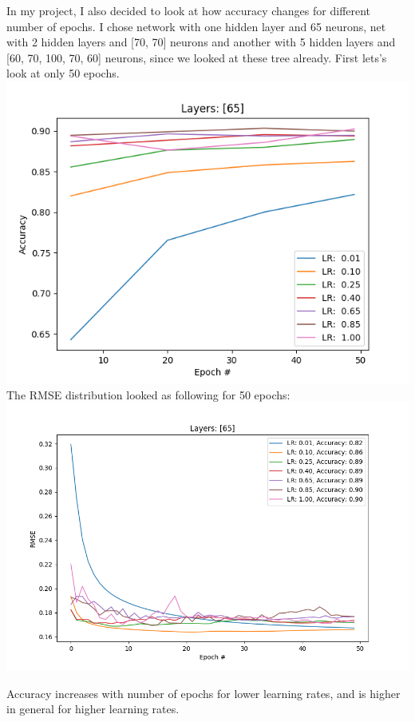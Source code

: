 \documentclass[12pt, letterpaper]{article}
\begin{document}
\begin{enumerate}[label=\Roman*.]
	   In my project, I also decided to look at how accuracy changes for different number of epochs. I chose network with one hidden layer and 65 neurons, net with 2 hidden layers and [70, 70] neurons and another with 5 hidden layers and  [60, 70, 100, 70, 60] neurons, since we looked at these tree already. First lets's look at only 50 epochs.
	   {\center \includegraphics[scale=0.7]{../images/accuracy_0.png} \\}
	   The RMSE distribution looked as following for 50 epochs: 
	   {\center \includegraphics[scale=0.7]{../images/rmse2_0.png} \\}
	          
	   Accuracy  increases with number of epochs for lower learning rates, and is higher in general for higher learning rates. \\
	          

\end{enumerate}
\end{document}
